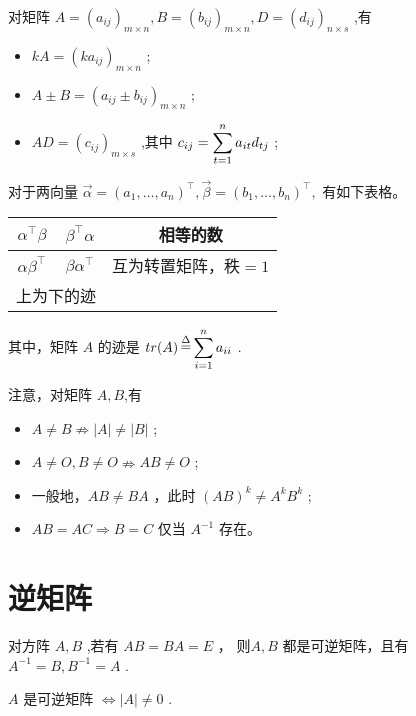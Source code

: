 对矩阵 $ A = (a_{ij})_{m\times n},B = (b_{ij})_{m\times n},D = (d_{ij})_{n\times s} $ ,有

\begin{itemize}
    \item $ kA = (ka_{ij})_{m\times n} $ ;
    \item $ A\pm B = (a_{ij}\pm b_{ij})_{m\times n} $ ;
    \item $ AD = (c_{ij})_{m\times s} $ ,其中 $ \displaystyle c_{ij} = \sum_{t = 1}^n a_{it}d_{tj} $ ;
\end{itemize}

对于两向量 $ \vec \alpha = (a_1,\dots,a_n)^\top, \vec \beta = (b_1,\dots, b_n)^\top, $ 
有如下表格。

\newpage

\begin{table}[!htbp]\centering
    \begin{tabular}{|cc|c}
    \hline
    \multicolumn{1}{|c|}{$\alpha^\top \beta$} & $\beta^\top \alpha$ & 相等的数   \\ \hline
    \multicolumn{1}{|c|}{$\alpha\beta^\top$}  & $\beta\alpha^\top$  & 互为转置矩阵，秩$  = 1 $  \\ \hline
    \multicolumn{2}{|c|}{上为下的迹}                   &       
    \end{tabular}
\end{table}

其中，矩阵 $ A $ 的迹是 $ \displaystyle tr(A)\mathop=\limits^\Delta \sum_{i=1}^n a_{ii} $ .

注意，对矩阵 $ A,B $,有
\begin{itemize}
    \item $ A\neq B \nRightarrow |A|\neq |B| $ ;
    \item $ A\neq O,B\neq O \nRightarrow AB \neq O $ ;
    \item 一般地，$ AB\neq BA $ ，此时 $ (AB)^k \neq A^kB^k $ ;
    \item $ AB = AC \Rightarrow B=C $ 仅当 $ A^{-1} $ 存在。
\end{itemize}

\section{逆矩阵}

对方阵 $ A,B $ ,若有 $ AB = BA = E $ ，
则$ A,B $ 都是可逆矩阵，且有  $ A^{-1} = B, B^{-1} = A $ .

\begin{Theo}[可逆的充要条件]

    $ A $ 是可逆矩阵 $ \Leftrightarrow |A| \neq 0 $ .
\end{Theo}

